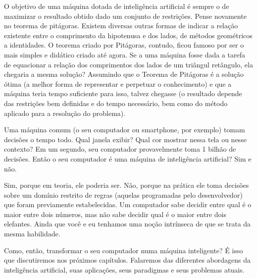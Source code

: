 \documentclass[11pt,a4paper,twoside,openany]{book}
\begin{document}
O objetivo de uma máquina dotada de inteligência artificial é sempre o de maximizar o resultado obtido dado um conjunto de restrições. Pense novamente no teorema de pitágoras. Existem diversas outras formas de indicar a relação existente entre o comprimento da hipotenusa e dos lados, de métodos geométricos a identidades. O teorema criado por Pitágoras, contudo, ficou famoso por ser o mais simples e didático criado até agora. Se a uma máquina fosse dada a tarefa de equacionar a relação dos comprimentos dos lados de um triângul  retângulo, ela chegaria a mesma solução? Assumindo que o Teorema de Pitágoras é a solução ótima (a melhor forma de representar e perpetuar o conhecimento) e que a máquina teria tempo suficiente para isso, talvez chegasse (o resultado depende das restrições bem definidas e do tempo necessário, bem como do método aplicado para a resolução do problema).

Uma máquina comum (o seu computador ou smartphone, por exemplo) tomam decisões o tempo todo. Qual janela exibir? Qual cor mostrar nessa tela ou nesse contexto? Em um segundo, seu computador provavelmente toma 1 bilhão de decisões. Então o seu computador é uma máquina de inteligência artificial? Sim e não.

Sim, porque em teoria, ele poderia ser. Não, porque na prática ele toma decisões sobre um domínio restrito de regras (aquelas programadas pelo desenvolvedor) que foram previamente estabelecidas. Um computador sabe decidir entre qual é o maior entre dois números, mas não sabe decidir qual é o maior entre dois elefantes. Ainda que você e eu tenhamos uma noção intrínseca de que se trata da mesma habilidade.

Como, então, transformar o seu computador numa máquina inteligente? É isso que discutiremos nos próximos capítulos. Falaremos das diferentes abordagens da inteligência artificial, suas aplicações, seus paradigmas e seus problemas atuais.
\end{document}
